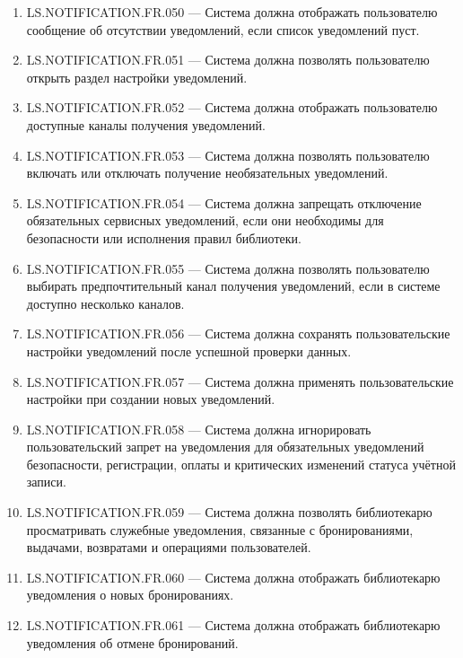 \documentclass[12pt,a4paper]{article}
\begin{document}
\begin{enumerate}
		\item LS.NOTIFICATION.FR.050 --- Система должна отображать пользователю сообщение
		об отсутствии уведомлений, если список уведомлений пуст.
		
		\item LS.NOTIFICATION.FR.051 --- Система должна позволять пользователю открыть
		раздел настройки уведомлений.
		
		\item LS.NOTIFICATION.FR.052 --- Система должна отображать пользователю доступные
		каналы получения уведомлений.
		
		\item LS.NOTIFICATION.FR.053 --- Система должна позволять пользователю включать
		или отключать получение необязательных уведомлений.
		
		\item LS.NOTIFICATION.FR.054 --- Система должна запрещать отключение обязательных
		сервисных уведомлений, если они необходимы для безопасности или исполнения
		правил библиотеки.
		
		\item LS.NOTIFICATION.FR.055 --- Система должна позволять пользователю выбирать
		предпочтительный канал получения уведомлений, если в системе доступно несколько
		каналов.
		
		\item LS.NOTIFICATION.FR.056 --- Система должна сохранять пользовательские настройки
		уведомлений после успешной проверки данных.
		
		\item LS.NOTIFICATION.FR.057 --- Система должна применять пользовательские настройки
		при создании новых уведомлений.
		
		\item LS.NOTIFICATION.FR.058 --- Система должна игнорировать пользовательский запрет
		на уведомления для обязательных уведомлений безопасности, регистрации, оплаты
		и критических изменений статуса учётной записи.
		
		\item LS.NOTIFICATION.FR.059 --- Система должна позволять библиотекарю просматривать
		служебные уведомления, связанные с бронированиями, выдачами, возвратами и
		операциями пользователей.
		
		\item LS.NOTIFICATION.FR.060 --- Система должна отображать библиотекарю уведомления
		о новых бронированиях.
		
		\item LS.NOTIFICATION.FR.061 --- Система должна отображать библиотекарю уведомления
		об отмене бронирований.
		

\end{enumerate}
\end{document}
